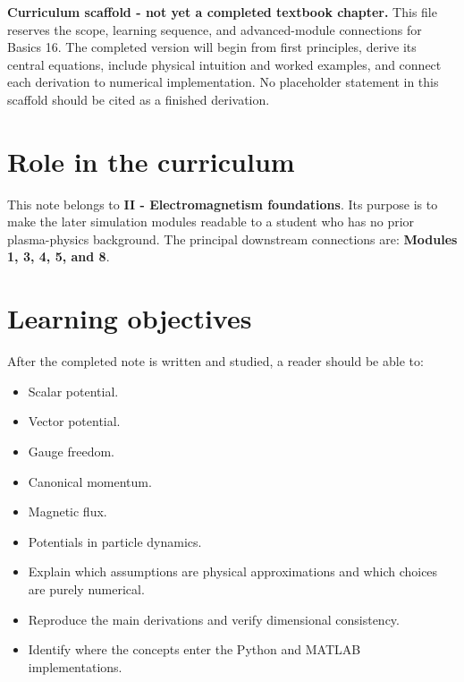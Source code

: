 \documentclass[11pt]{article}
\begin{document}

\begin{overviewbox}
\textbf{Curriculum scaffold - not yet a completed textbook chapter.} This file reserves the scope, learning sequence, and advanced-module connections for Basics 16. The completed version will begin from first principles, derive its central equations, include physical intuition and worked examples, and connect each derivation to numerical implementation. No placeholder statement in this scaffold should be cited as a finished derivation.
\end{overviewbox}

\ProjectTOC

\section{Role in the curriculum}
This note belongs to \textbf{II - Electromagnetism foundations}. Its purpose is to make the later simulation modules readable to a student who has no prior plasma-physics background. The principal downstream connections are: \textbf{Modules 1, 3, 4, 5, and 8}.

\section{Learning objectives}
After the completed note is written and studied, a reader should be able to:
\begin{itemize}[leftmargin=1.6em]
\item Scalar potential.
\item Vector potential.
\item Gauge freedom.
\item Canonical momentum.
\item Magnetic flux.
\item Potentials in particle dynamics.
\item Explain which assumptions are physical approximations and which choices are purely numerical.
\item Reproduce the main derivations and verify dimensional consistency.
\item Identify where the concepts enter the Python and MATLAB implementations.
\end{itemize}
\end{document}

